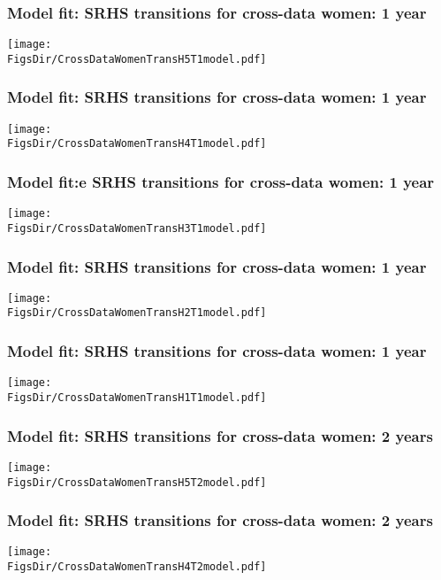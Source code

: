 \documentclass[aspectratio=169]{beamer}
\newcommand{\FigsDir}{../Figures}
\begin{document}
\begin{frame}\frametitle{Model fit: SRHS transitions for cross-data women: 1 year}
\begin{center}
	\texttt{[image: \\FigsDir/CrossDataWomenTransH5T1model.pdf]}
\end{center}
\end{frame}

\begin{frame}\frametitle{Model fit: SRHS transitions for cross-data women: 1 year}
\begin{center}
\texttt{[image: \\FigsDir/CrossDataWomenTransH4T1model.pdf]}
\end{center}
\end{frame}

\begin{frame}\frametitle{Model fit:e SRHS transitions for cross-data women: 1 year}
\begin{center}
\texttt{[image: \\FigsDir/CrossDataWomenTransH3T1model.pdf]}
\end{center}
\end{frame}

\begin{frame}\frametitle{Model fit: SRHS transitions for cross-data women: 1 year}
\begin{center}
\texttt{[image: \\FigsDir/CrossDataWomenTransH2T1model.pdf]}
\end{center}
\end{frame}

\begin{frame}\frametitle{Model fit: SRHS transitions for cross-data women: 1 year}
\begin{center}
\texttt{[image: \\FigsDir/CrossDataWomenTransH1T1model.pdf]}
\end{center}
\end{frame}

\begin{frame}\frametitle{Model fit: SRHS transitions for cross-data women: 2 years}
\begin{center}
\texttt{[image: \\FigsDir/CrossDataWomenTransH5T2model.pdf]}
\end{center}
\end{frame}

\begin{frame}\frametitle{Model fit: SRHS transitions for cross-data women: 2 years}
\begin{center}
\texttt{[image: \\FigsDir/CrossDataWomenTransH4T2model.pdf]}
\end{center}
\end{frame}
\end{document}
